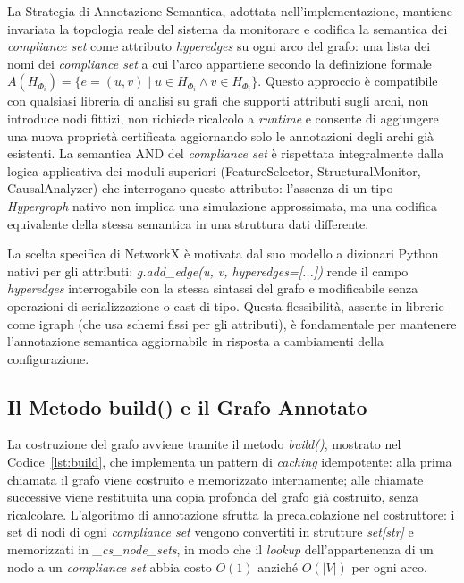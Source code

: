 La Strategia di Annotazione Semantica, adottata nell'implementazione, mantiene invariata la
topologia reale del sistema da monitorare e codifica la semantica dei \textit{compliance set}
come attributo \textit{hyperedges} su ogni arco del grafo: una lista dei nomi dei
\textit{compliance set} a cui l'arco appartiene secondo la definizione formale
$A(H_{\Phi_i}) = \{e = (u,v) \mid u \in H_{\Phi_i} \wedge v \in H_{\Phi_i}\}$. Questo
approccio è compatibile con qualsiasi libreria di analisi su grafi che supporti attributi sugli
archi, non introduce nodi fittizi, non richiede ricalcolo a \textit{runtime} e consente di
aggiungere una nuova proprietà certificata aggiornando solo le annotazioni degli archi già
esistenti. La semantica AND del \textit{compliance set} è rispettata integralmente dalla
logica applicativa dei moduli superiori (FeatureSelector, StructuralMonitor, CausalAnalyzer)
che interrogano questo attributo: l'assenza di un tipo \textit{Hypergraph} nativo non implica
una simulazione approssimata, ma una codifica equivalente della stessa semantica in una
struttura dati differente.

La scelta specifica di NetworkX è motivata dal suo modello a dizionari Python nativi per
gli attributi: \textit{g.add\_edge(u, v, hyperedges=[...])} rende il campo \textit{hyperedges}
interrogabile con la stessa sintassi del grafo e modificabile senza operazioni di
serializzazione o cast di tipo. Questa flessibilità, assente in librerie come igraph (che usa
schemi fissi per gli attributi), è fondamentale per mantenere l'annotazione semantica
aggiornabile in risposta a cambiamenti della configurazione.

\subsection{Il Metodo build() e il Grafo Annotato}
\label{subsec:build_method}

La costruzione del grafo avviene tramite il metodo \textit{build()}, mostrato nel
Codice~\ref{lst:build}, che implementa un pattern di \textit{caching} idempotente:
alla prima chiamata il grafo viene costruito e memorizzato
internamente; alle chiamate successive viene restituita una copia profonda del grafo già
costruito, senza ricalcolare. L'algoritmo di annotazione sfrutta la precalcolazione nel
costruttore: i set di nodi di ogni \textit{compliance set} vengono convertiti in strutture
\textit{set[str]} e memorizzati in \textit{\_cs\_node\_sets}, in modo che il \textit{lookup}
dell'appartenenza di un nodo a un \textit{compliance set} abbia costo $O(1)$ anziché $O(|V|)$
per ogni arco.

